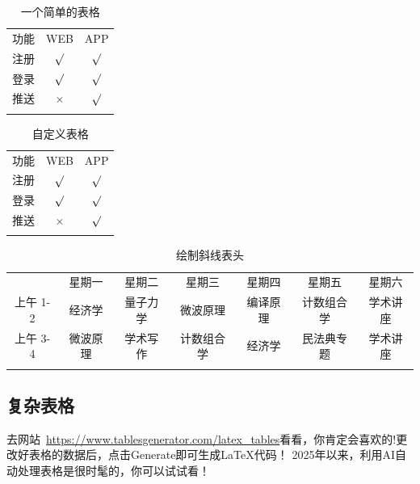 \begin{table}[htp]
	\caption{一个简单的表格}\label{tab1}
	\centering
	\begin{tabular}{:l:c:c:}
		\Xhline{1.5pt}
		功能          &WEB         &APP         \\ \Xhline{1pt}
		注册          &$\surd$     &$\surd$     \\ \hdashline
		登录          &$\surd$     &$\surd$     \\ \hdashline
		推送          &$\times$    &$\surd$     \\ \Xhline{1.5pt}
	\end{tabular}
\end{table}

\begin{table}[htp]
	\caption{自定义表格}\label{tab2}
	\centering
	\begin{tabular*}{0.75\textwidth}{:l:c:c:}
		\Xhline{1.5pt}
		功能          &WEB         &APP         \\ \Xhline{1pt}
		注册          &$\surd$     &$\surd$     \\ \hdashline
		登录          &$\surd$     &$\surd$     \\ \hdashline
		推送          &$\times$    &$\surd$     \\ \Xhline{1.5pt}
	\end{tabular*}
\end{table}


\begin{table}[h]
\centering
\caption{绘制斜线表头}
\begin{tabular}{:c:c:c:c:c:c:c:}
\Xhline{1.5pt}
 & 星期一 & 星期二 & 星期三 & 星期四 & 星期五 & 星期六 \\ \Xhline{1pt}
上午 1-2 &  经济学  &  量子力学  &  微波原理 &  编译原理 & 计数组合学 & 学术讲座 \\ \hdashline
上午 3-4 &  微波原理 & 学术写作  &  计数组合学& 经济学   & 民法典专题  & 学术讲座       \\ \Xhline{1.5pt}
\end{tabular}
\end{table}

\subsection{复杂表格}

去网站~\url{https://www.tablesgenerator.com/latex_tables}看看，你肯定会喜欢的!更改好表格的数据后，点击Generate即可生成\LaTeX 代码！ 2025年以来，利用AI自动处理表格是很时髦的，你可以试试看！


